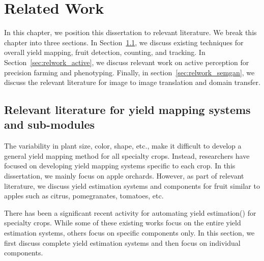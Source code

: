 \chapter{Related Work} \label{chapter:relwork}
In this chapter, we position this dissertation to relevant literature. We break this chapter into three sections. In Section~\ref{sec:relwork_yield}, we discuss existing techniques for overall yield mapping, fruit detection, counting, and tracking. In Section~\ref{sec:relwork_active}, we discuss relevant work on active perception for precision farming and phenotyping. Finally, in section~\ref{sec:relwork_semgan}, we discuss the relevant literature for image to image translation and domain transfer.


\section{Relevant literature for yield mapping systems and sub-modules}\label{sec:relwork_yield} 
 
The variability in plant size, color, shape, etc., make it difficult to develop a general yield mapping method for all specialty crops. Instead, researchers have focused on developing yield mapping systems specific to each crop. In this dissertation, we mainly focus on apple orchards. However, as part of relevant literature, we discuss yield estimation systems and components for fruit similar to apples such as citrus, pomegranates, tomatoes, etc.

There has been a significant recent activity for automating yield estimation(\cite{wang, das2015devices, hung2015feature,gongal2016apple}) for specialty crops. While some of these existing works focus on the entire yield estimation systems, others focus on specific components only. In this section, we first discuss complete yield estimation systems and then focus on individual components.

